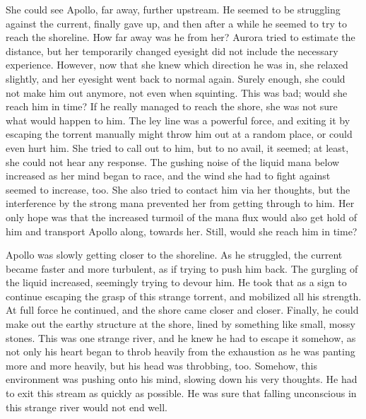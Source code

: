 She could see Apollo, far away, further upstream. He seemed to be struggling against the current, finally gave up, and then after a while he seemed to try to reach the shoreline. How far away was he from her? Aurora tried to estimate the distance, but her temporarily changed eyesight did not include the necessary experience. However, now that she knew which direction he was in, she relaxed slightly, and her eyesight went back to normal again. Surely enough, she could not make him out anymore, not even when squinting. This was bad; would she reach him in time? If he really managed to reach the shore, she was not sure what would happen to him. The ley line was a powerful force, and exiting it by escaping the torrent manually might throw him out at a random place, or could even hurt him. She tried to call out to him, but to no avail, it seemed; at least, she could not hear any response. The gushing noise of the liquid mana below increased as her mind began to race, and the wind she had to fight against seemed to increase, too. She also tried to contact him via her thoughts, but the interference by the strong mana prevented her from getting through to him. Her only hope was that the increased turmoil of the mana flux would also get hold of him and transport Apollo along, towards her. Still, would she reach him in time?

\fancybreaker{}

Apollo was slowly getting closer to the shoreline. As he struggled, the current became faster and more turbulent, as if trying to push him back. The gurgling of the liquid increased, seemingly trying to devour him. He took that as a sign to continue escaping the grasp of this strange torrent, and mobilized all his strength. At full force he continued, and the shore came closer and closer. Finally, he could make out the earthy structure at the shore, lined by something like small, mossy stones. This was one strange river, and he knew he had to escape it somehow, as not only his heart began to throb heavily from the exhaustion as he was panting more and more heavily, but his head was throbbing, too. Somehow, this environment was pushing onto his mind, slowing down his very thoughts. He had to exit this stream as quickly as possible. He was sure that falling unconscious in this strange river would not end well.

